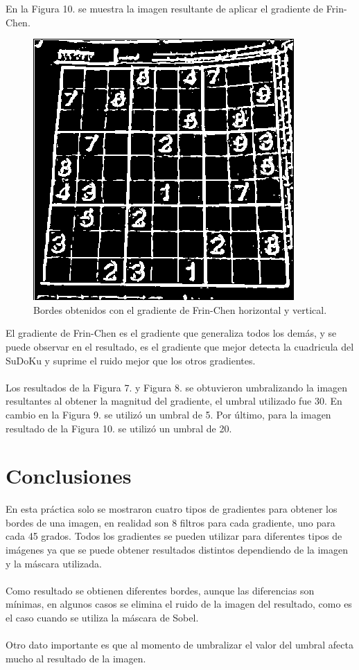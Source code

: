 \documentclass[conference]{IEEEtran}
\begin{document}
En la Figura 10. se muestra la imagen resultante de aplicar el gradiente de Frin-Chen.\\

\begin{figure}[h]
	\centering
	\setlength{\unitlength}{0.00105in}
	\includegraphics[scale=0.60]{./images/frinchenXY.png}
	\caption{Bordes obtenidos con el gradiente de Frin-Chen horizontal y vertical. }
\end{figure}

El gradiente de Frin-Chen es el gradiente que generaliza todos los dem\'as, y se puede observar en el resultado, es el gradiente que mejor detecta la cuadricula del SuDoKu y suprime el ruido mejor que los otros gradientes.\\\\

Los resultados de la Figura 7. y Figura 8. se obtuvieron umbralizando la imagen resultantes al obtener la magnitud del gradiente, el umbral utilizado fue 30. En cambio en la Figura 9. se utiliz\'o un umbral de 5.  Por \'ultimo, para la imagen resultado de la Figura 10. se utiliz\'o un umbral de 20.

\newpage
\section{Conclusiones}
En esta pr\'actica solo se mostraron cuatro tipos de gradientes para obtener los bordes de una imagen, en realidad son 8 filtros para cada gradiente, uno para cada 45 grados. Todos los gradientes se pueden utilizar para diferentes tipos de im\'agenes ya que se puede obtener resultados distintos dependiendo de la imagen y la m\'ascara utilizada.\\\\
Como resultado se obtienen diferentes bordes, aunque las diferencias son m\'inimas, en algunos casos se elimina el ruido de la imagen del resultado, como es el caso cuando se utiliza la m\'ascara de Sobel.\\\\
Otro dato importante es que al momento de umbralizar el valor del umbral afecta mucho al resultado de la imagen.
\end{document}
